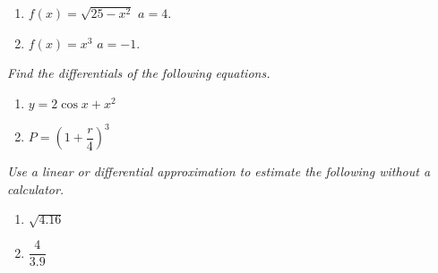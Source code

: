 \documentclass[11pt]{article}
\begin{document}
\noindent
\begin{multicols}{2}
\begin{enumerate}
\setcounter{enumi}{\theenumCount}
\item $f(x) = \sqrt{25-x^2}$  $a = 4$.
\item $f(x) = x^3$  $ a = -1$.
\setcounter{enumCount}{\theenumi}
\end{enumerate}
\end{multicols}
\vfill


\noindent 
\textit{Find the differentials of the following equations.}
\noindent
\begin{multicols}{2}
\begin{enumerate}
\setcounter{enumi}{\theenumCount}
\item $y = 2\cos x + x^2$
\item $P = \left(1 + \dfrac{r}{4}\right)^{3}$
\setcounter{enumCount}{\theenumi}
\end{enumerate}
\end{multicols}
\vfill

\noindent 
\textit{Use a linear or differential approximation to estimate the following without a calculator.}
\noindent
\begin{multicols}{2}
\begin{enumerate}
\setcounter{enumi}{\theenumCount}
\item $\sqrt{4.16}$
\item $\dfrac{4}{3.9}$
\setcounter{enumCount}{\theenumi}
\end{enumerate}
\end{multicols}
\vfill
\end{document}
